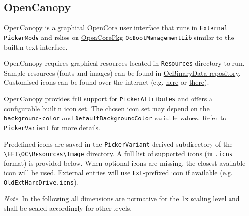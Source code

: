 \documentclass[]{article}
\begin{document}
\subsection{OpenCanopy}\label{ueficanopy}

OpenCanopy is a graphical OpenCore user interface that runs in
\texttt{External} \texttt{PickerMode} and relies on
\href{https://github.com/acidanthera/OpenCorePkg}{OpenCorePkg} \texttt{OcBootManagementLib}
similar to the builtin text interface.

OpenCanopy requires graphical resources located in \texttt{Resources} directory to run.
Sample resources (fonts and images) can be found in
\href{https://github.com/acidanthera/OcBinaryData}{OcBinaryData repository}. Customised icons can be found over the internet
(e.g. \href{https://github.com/blackosx/OpenCanopyIcons}{here} or \href{https://applelife.ru/threads/kastomizacija-opencanopy.2945020/}{there}).

OpenCanopy provides full support for \texttt{PickerAttributes} and offers a configurable
builtin icon set. The chosen icon set may depend on the \texttt{background-color} and
\texttt{DefaultBackgroundColor} variable values. Refer to \texttt{PickerVariant} for more details.

Predefined icons are saved in the \texttt{PickerVariant}-derived subdirectory of the
\texttt{\textbackslash EFI\textbackslash OC\textbackslash Resources\textbackslash Image}
directory. A full list of supported icons (in \texttt{.icns} format) is provided below. When optional icons
are missing, the closest available icon will be used. External entries will use \texttt{Ext}-prefixed
icon if available (e.g. \texttt{OldExtHardDrive.icns}).

\emph{Note}: In the following all dimensions are normative for the 1x scaling level and shall be
scaled accordingly for other levels.
\end{document}
